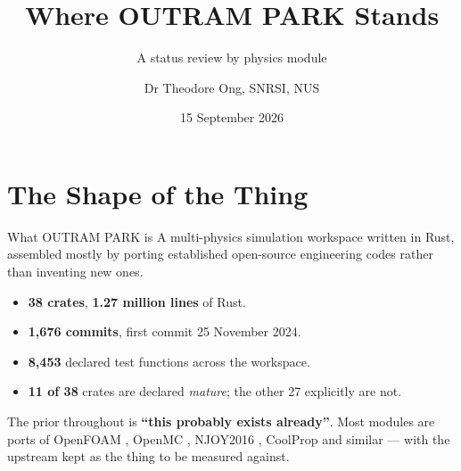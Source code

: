 \documentclass[aspectratio=169]{beamer}
\institute{Singapore Nuclear Research and Safety Institute}
\title[Where OUTRAM PARK Stands]
      {Where OUTRAM PARK Stands}
\subtitle{A status review by physics module}
\author{Dr Theodore Ong, SNRSI, NUS}
\date{15 September 2026}
\begin{document}
\begin{frame}
    \titlepage
\end{frame}


\section{The Shape of the Thing}

\begin{frame}{What OUTRAM PARK is}
    A multi-physics simulation workspace written in Rust, assembled mostly by
    porting established open-source engineering codes rather than inventing new
    ones.

    \medskip
    \begin{itemize}
        \item \textbf{38 crates}, \textbf{1.27 million lines} of Rust.
        \item \textbf{1{,}676 commits}, first commit 25 November 2024.
        \item \textbf{8{,}453} declared test functions across the workspace.
        \item \textbf{11 of 38} crates are declared \emph{mature}; the other 27
              explicitly are not.
    \end{itemize}

    \medskip
    The prior throughout is \textbf{``this probably exists already''}. Most
    modules are ports of OpenFOAM \parencite{weller1998tensorial},
    OpenMC \parencite{romano2015openmc}, NJOY2016
    \parencite{macfarlane2017njoy}, CoolProp \parencite{bell2014coolprop} and
    similar --- with the upstream kept as the thing to be measured against.
\end{frame}
\end{document}

